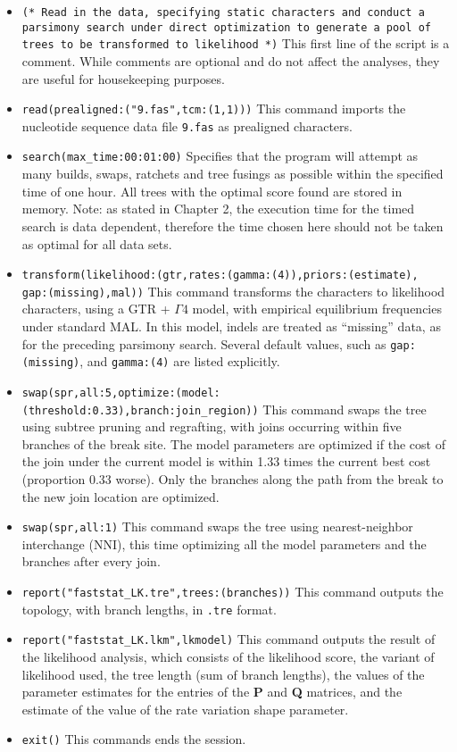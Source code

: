 \begin{itemize}
\item \texttt{(* Read in the data, specifying static characters and conduct a parsimony search under direct optimization 
to generate a pool of trees to be transformed to likelihood *)} This first line of the script is a comment. While 
comments are optional and do not affect the analyses, they are useful for housekeeping purposes.
\item \texttt{read(prealigned:("9.fas",tcm:(1,1)))} This command imports the nucleotide sequence data file \texttt{9.fas} 
as prealigned characters.
\item \texttt{search(max\_time:00:01:00)} Specifies that the program will attempt as many builds, swaps, ratchets 
and tree fusings as possible within the specified time of one hour. All trees with the optimal score found are stored 
in memory. Note: as stated in Chapter 2, the execution time for the timed search is data dependent, 
therefore the time chosen here should not be taken as optimal for all data sets.
\item \texttt{transform(likelihood:(gtr,rates:(gamma:(4)),priors:(estimate),\\ gap:(missing),mal))} This command 
transforms the characters to likelihood characters, using a GTR + $\Gamma 4$ model, with empirical 
equilibrium frequencies under standard MAL. In this model, indels are treated as ``missing'' data, as for the 
preceding parsimony search. Several default values, such as \texttt{gap:(missing)}, and \texttt{gamma:(4)} are 
listed explicitly.
\item \texttt{swap(spr,all:5,optimize:(model:(threshold:0.33),branch:join\_region))} This command swaps the tree using 
subtree pruning and regrafting, with joins occurring within five branches of the break site. The model parameters are
optimized if the cost of the join under the current model is within 1.33 times the current best cost (proportion 0.33 worse). 
Only the branches along the path from the break to the new join location are optimized. 
\item \texttt{swap(spr,all:1)} This command swaps the tree using nearest-neighbor interchange (NNI), this time
optimizing all the model parameters and the branches after every join.
\item \texttt{report("faststat\_LK.tre",trees:(branches))} This command outputs the topology, with branch lengths, in 
\texttt{.tre} format.
\item \texttt{report("faststat\_LK.lkm",lkmodel)} This command outputs the result of the likelihood analysis, which 
consists of the likelihood score, the variant of likelihood used, the tree length (sum of branch lengths), the values 
of the parameter estimates for the entries of the \textbf{P} and \textbf{Q} matrices, and the estimate of the value of 
the rate variation shape parameter.
\item \texttt{exit()} This commands ends the \poy session.
\end{itemize}

